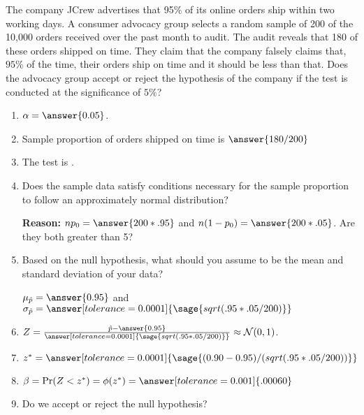 \documentclass{ximera}
\begin{document}
\begin{problem}
The company JCrew advertises that 95\% of its online orders ship within two working
days. A consumer advocacy group selects a random sample of 200 of the 10,000 orders received over the past month to
audit. The audit reveals that 180 of these orders shipped on time. They claim that the company falsely claims that, $95\%$ of the time, their orders ship on time and it should be less than that. Does the advocacy group accept or reject the hypothesis of the company if the test is conducted at the significance of $5\%$?


\begin{enumerate}
    \item $\alpha=\answer{0.05}$.
    \item Sample proportion of orders shipped on time is $\answer{180/200}$
     \item The test is .
    \item Does the sample data satisfy conditions necessary for the sample proportion to follow an
approximately normal distribution?
\begin{multipleChoice}
\end{multipleChoice}
{\bf Reason:} $np_0=\answer{200*.95}$
and $n(1-p_0)=\answer{200*.05}$. Are they both greater than 5? 
    
    \item Based on the null hypothesis, what should you assume to be the mean and standard deviation of your data? 

$\mu_{\hat p}=\answer{0.95}$ and $\sigma_{\hat p}=\answer[tolerance=0.0001]{\sage{sqrt(.95*.05/200)}}$
    \item $Z=\frac{\hat p -\answer{0.95}}{\answer[tolerance=0.0001]{\sage{sqrt(.95*.05/200)}}}\approx \mathcal N(0,1)$.
    \item $z^*=\answer[tolerance=0.0001]{\sage{(0.90 -0.95)/(sqrt(.95*.05/200))}}$
    \item $\beta=\Pr(Z<z^*)=\phi(z^*)=\answer[tolerance=0.001]{.00060}$
    \item Do we accept or reject the null hypothesis?
    \begin{multipleChoice}
    \end{multipleChoice}
\end{enumerate}
\end{problem}
\end{document}
